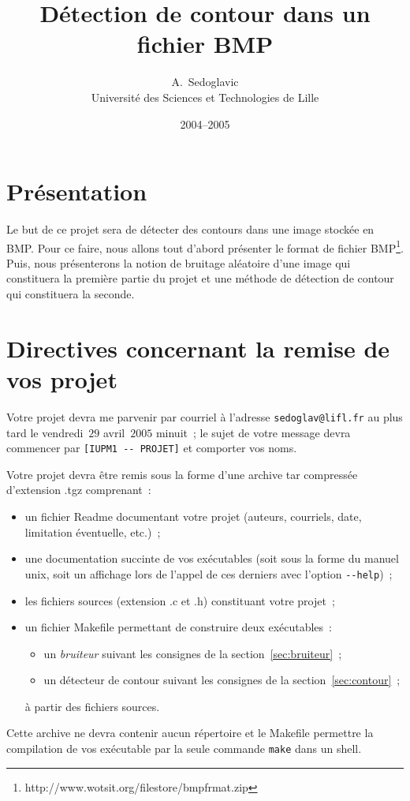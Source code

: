 \documentclass[a4paper]{article}
\title{D\'etection de contour dans un fichier BMP}
\author{A.~Sedoglavic \\
Universit\'e des Sciences et Technologies de Lille}
\date{2004--2005}
\begin{document}
\maketitle
\section{Pr\'esentation}

Le but de ce projet sera de d\'etecter des contours dans une image
stock\'ee en BMP\@.  Pour ce faire, nous allons tout d'abord
pr\'esenter le format de fichier
BMP\footnote{http://www.wotsit.org/filestore/bmpfrmat.zip}. Puis, nous
pr\'esenterons la notion de bruitage al\'eatoire d'une image qui
constituera la premi\`ere partie du projet et une m\'ethode de
d\'etection de contour qui constituera la seconde.

\section{Directives concernant la remise de vos projet}
Votre projet devra me parvenir par courriel \`a l'adresse
\verb?sedoglav@lifl.fr? au plus tard le vendredi~$29$ avril~$2005$ minuit~;
le sujet de votre message devra commencer par \verb?[IUPM1 -- PROJET]?
et comporter vos noms.

Votre projet devra \^etre remis sous la forme d'une archive tar
compress\'ee d'extension .tgz comprenant~:
\begin{itemize}
\item un fichier Readme documentant votre projet (auteurs, courriels,
  date, limitation \'eventuelle, etc.)~;
\item une documentation succinte de vos ex\'ecutables (soit sous la
  forme du manuel unix, soit un affichage lors de l'appel de ces
  derniers avec l'option \verb?--help?)~;
\item les fichiers sources (extension .c et .h) constituant votre
  projet~;
\item un fichier Makefile permettant de construire deux  ex\'ecutables~:
  \begin{itemize}
  \item un \textit{bruiteur} suivant les consignes de la
    section~\ref{sec:bruiteur}~;
  \item un d\'etecteur de contour suivant les consignes de la
    section~\ref{sec:contour}~;
  \end{itemize}
  \`a partir des fichiers sources.
\end{itemize}
Cette archive ne devra contenir aucun r\'epertoire et le Makefile
permettre la compilation de vos ex\'ecutable par la seule commande
\verb?make? dans un shell.
\end{document}
